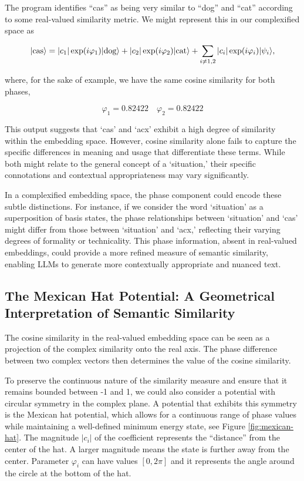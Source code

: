 \documentclass[prd,amsmath,amssymb,12pt]{revtex4}
\DeclarePairedDelimiter\ket{\lvert}{\rangle}
\begin{document}
The program identifies ``cas'' as being very similar to ``dog'' and ``cat'' according to some real-valued similarity metric.
We might represent this in our complexified space as

\begin{equation}
    \ket{\text{cas}} =   |c_1|\exp(i\varphi_1)\ket{\text{dog}}   +
    |c_2|\exp(i\varphi_2)\ket{\text{cat}} + \sum_{i \ne 1,2} |c_i|\exp(i\varphi_i) \ket{\psi_i},
\end{equation}

\noindent
where, for the sake of example, we have the same cosine similarity for both phases,

\begin{equation}
    \varphi_1 = 0.82422 \quad \varphi_2 = 0.82422
\end{equation}

\noindent
This output suggests that `cas' and `acx' exhibit a high degree of similarity within the
embedding space. However, cosine similarity alone fails to capture the specific differences
in meaning and usage that differentiate these terms. While both might relate to the general
concept of a `situation,' their specific connotations and contextual appropriateness may vary
significantly.

In a complexified embedding space, the phase component could encode these subtle distinctions. For instance,
if we consider the word `situation' as a superposition of basis states, the phase relationships between
`situation' and `cas' might differ from those between `situation' and `acx,' reflecting their varying
degrees of formality or technicality. This phase information, absent in real-valued embeddings, could
provide a more refined measure of semantic similarity, enabling LLMs to generate more contextually
appropriate and nuanced text.

\subsection{The Mexican Hat Potential: A Geometrical Interpretation of Semantic Similarity}

The cosine similarity in the real-valued embedding space can be seen as a projection of the complex
similarity onto the real axis. The phase difference between two complex vectors then determines the
value of the cosine similarity.

To preserve the continuous nature of the similarity measure and ensure that it remains bounded between -1 and 1, we
could also consider a potential with circular symmetry in the complex plane. A potential that exhibits this symmetry
is the Mexican hat potential, which allows for a continuous range of phase values while maintaining a
well-defined minimum energy state, see Figure \ref{fig:mexican-hat}. The magnitude $|c_i|$ of the coefficient
represents the ``distance''
from the center of the hat. A larger magnitude means the state is further away from the center.
Parameter $\varphi_i$ can have values $[0,2\pi]$ and it represents the angle around the circle at the bottom of the hat.
\end{document}

